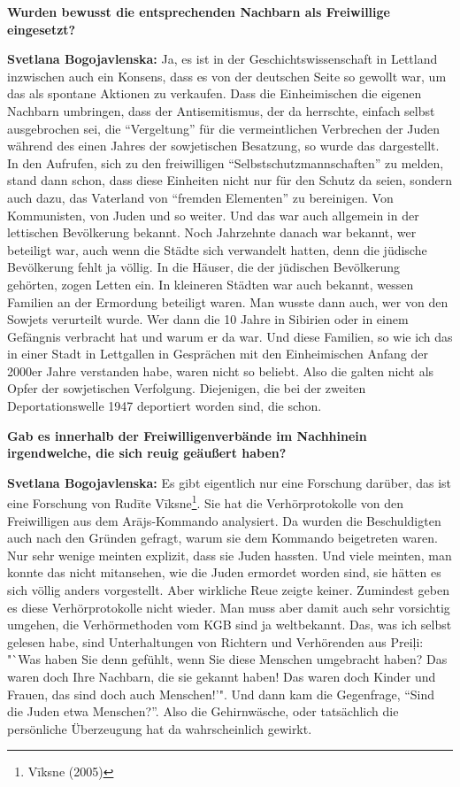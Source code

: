 \textbf{Wurden bewusst die entsprechenden Nachbarn als Freiwillige eingesetzt?}

\textbf{Svetlana Bogojavlenska:} Ja, es ist in der Geschichtswissenschaft in Lettland inzwischen auch ein Konsens, dass es von der deutschen Seite so gewollt war, um das als spontane Aktionen zu verkaufen. Dass die Einheimischen die eigenen Nachbarn umbringen, dass der Antisemitismus, der da herrschte, einfach selbst ausgebrochen sei, die "`Vergeltung"' für die vermeintlichen Verbrechen der Juden während des einen Jahres der sowjetischen Besatzung, so wurde das dargestellt. In den Aufrufen, sich zu den freiwilligen "`Selbstschutzmannschaften"' zu melden, stand dann schon, dass diese Einheiten nicht nur für den Schutz da seien, sondern auch dazu, das Vaterland von "`fremden Elementen"' zu bereinigen. Von Kommunisten, von Juden und so weiter. Und das war auch allgemein in der lettischen Bevölkerung bekannt. Noch Jahrzehnte danach war bekannt, wer beteiligt war, auch wenn die Städte sich verwandelt hatten, denn die jüdische Bevölkerung fehlt ja völlig. In die Häuser, die der jüdischen Bevölkerung gehörten, zogen Letten ein. In kleineren Städten war auch bekannt, wessen Familien an der Ermordung beteiligt waren. Man wusste dann auch, wer von den Sowjets verurteilt wurde. Wer dann die 10 Jahre in Sibirien oder in einem Gefängnis verbracht hat und warum er da war. Und diese Familien, so wie ich das in einer Stadt in Lettgallen in Gesprächen mit den Einheimischen Anfang der 2000er Jahre verstanden habe, waren nicht so beliebt. Also die galten nicht als Opfer der sowjetischen Verfolgung. Diejenigen, die bei der zweiten Deportationswelle 1947 deportiert worden sind, die schon.

\textbf{Gab es innerhalb der Freiwilligenverbände im Nachhinein irgendwelche, die sich reuig geäußert haben?}

\textbf{Svetlana Bogojavlenska:} Es gibt eigentlich nur eine Forschung darüber, das ist eine Forschung von Rudīte Vīksne\footnote{Vīksne (2005)}.  Sie hat die Verhörprotokolle von den Freiwilligen aus dem Arājs-Kommando analysiert. Da wurden die Beschuldigten auch nach den Gründen gefragt, warum sie dem Kommando beigetreten waren. Nur sehr wenige meinten explizit, dass sie Juden hassten. Und viele meinten, man konnte das nicht mitansehen, wie die Juden ermordet worden sind, sie hätten es sich völlig anders vorgestellt. Aber wirkliche Reue zeigte keiner. Zumindest geben es diese Verhörprotokolle nicht wieder. Man muss aber damit auch sehr vorsichtig umgehen, die Verhörmethoden vom KGB sind ja weltbekannt. Das, was ich selbst gelesen habe, sind Unterhaltungen von Richtern und Verhörenden aus Preiļi: "`Was haben Sie denn gefühlt, wenn Sie diese Menschen umgebracht haben? Das waren doch Ihre Nachbarn, die sie gekannt haben! Das waren doch Kinder und Frauen, das sind doch auch Menschen!'". Und dann kam die Gegenfrage, "`Sind die Juden etwa Menschen?"'. Also die Gehirnwäsche, oder tatsächlich die persönliche Überzeugung hat da wahrscheinlich gewirkt.

